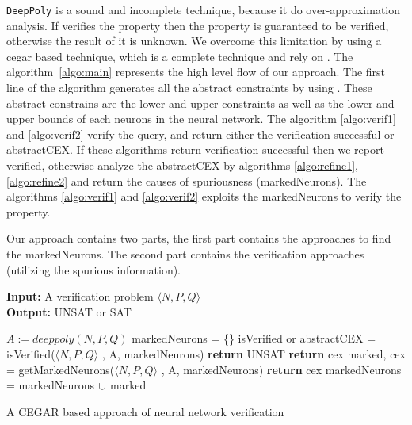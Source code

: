 \texttt{DeepPoly} is a sound and incomplete technique, because it do over-approximation analysis. 
If \deeppoly{} verifies the property then the property is guaranteed to be verified, otherwise the result of it is unknown. 
We overcome this limitation by using a cegar based technique, which is a complete technique and rely on \deeppoly{}. 
The algorithm~\ref{algo:main} represents the high level flow of our approach.
The first line of the algorithm generates all the abstract constraints by using \deeppoly{}. 
These abstract constrains are the lower and upper constraints as well as the lower and upper bounds 
of each neurons in the neural network. The algorithm \ref{algo:verif1} and \ref{algo:verif2} verify the query, 
and return either the verification successful or abstractCEX. If these algorithms return verification successful then we report verified,
otherwise analyze the abstractCEX by algorithms \ref{algo:refine1}, \ref{algo:refine2} and return the causes of spuriousness (markedNeurons). 
The algorithms \ref{algo:verif1} and \ref{algo:verif2} exploits the markedNeurons to verify the property. 

Our approach contains two parts, the first part contains the approaches to find the markedNeurons. 
The second part contains the verification approaches (utilizing the spurious information).

\begin{algorithm}[t]
  \textbf{Input: } A verification problem $\langle N,P,Q \rangle$ \\
  \textbf{Output: } UNSAT or SAT
  \begin{algorithmic}[1]
    \State $A := deeppoly(N,P,Q)$
    \State markedNeurons = \{\}
      \State isVerified or abstractCEX = isVerified($\langle N,P,Q \rangle$ , A, markedNeurons)
        \State \textbf{return} UNSAT
      \Else
          \State \textbf{return} cex
        \Else
          \State marked, cex = getMarkedNeurons($\langle N,P,Q \rangle$ , A, markedNeurons)
            \State \textbf{return} cex
          \EndIf
          \State markedNeurons = markedNeurons ${\cup}$ marked
        \EndIf
      \EndIf
    \EndWhile
  \end{algorithmic}
  \caption{A CEGAR based approach of neural network verification}
  \label{algo:main}
\end{algorithm}

